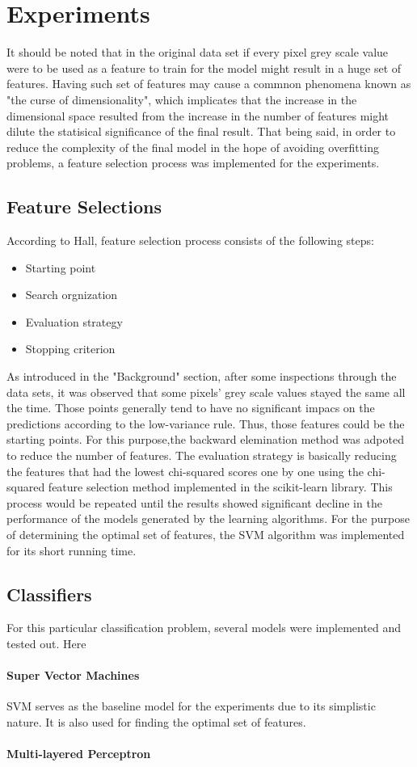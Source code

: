 
\section{Experiments}
\label{sec:expts}
It should be noted that in the original data set if every pixel grey scale value were to be used as a feature to train for the model might result in a huge set of features. Having such set of features may cause a commnon phenomena known as "the curse of dimensionality", which implicates that the increase in the dimensional space resulted from the increase in the number of features might dilute the statisical significance of the final result.\cite{bellman}
That being said, in order to reduce the complexity of the final model in the hope of avoiding overfitting problems, a feature selection process was implemented for the experiments.\cite{hall}
\subsection{Feature Selections}
\label{feature}
According to Hall, feature selection process consists of the following steps:
\begin{itemize}
	\item Starting point
	\item Search orgnization
	\item Evaluation strategy
	\item Stopping criterion

\end{itemize}
As introduced in the "Background" section, after some inspections through the data sets, it was observed that some pixels' grey scale values stayed the same all the time. Those points generally tend to have no significant impacs on the predictions according to the low-variance rule. Thus, those features could be the starting points. For this purpose,the backward elemination method was adpoted to reduce the number of features.\cite{hall}
The evaluation strategy is basically reducing the features that had the lowest chi-squared scores one by one using the chi-squared feature selection method implemented in the scikit-learn library. This process would be repeated until the results showed significant decline in the performance of the models generated by the learning algorithms. For the purpose of determining the optimal set of features, the SVM algorithm was implemented for its short running time.

\subsection{Classifiers}
\label{class}
For this particular classification problem, several models were implemented and tested out. Here
\paragraph{Super Vector Machines}
SVM serves as the baseline model for the experiments due to its simplistic nature. It is also used for finding the optimal set of features.
\paragraph{Multi-layered Perceptron}

